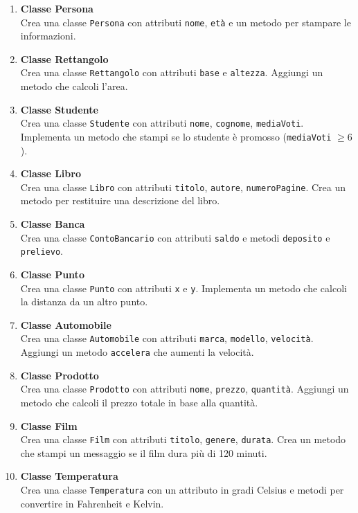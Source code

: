 \documentclass{article}
\begin{document}
\begin{enumerate}
    \item \textbf{Classe Persona} \\
    Crea una classe \texttt{Persona} con attributi \texttt{nome}, \texttt{età} e un metodo per stampare le informazioni.

    \item \textbf{Classe Rettangolo} \\
    Crea una classe \texttt{Rettangolo} con attributi \texttt{base} e \texttt{altezza}. Aggiungi un metodo che calcoli l'area.

    \item \textbf{Classe Studente} \\
    Crea una classe \texttt{Studente} con attributi \texttt{nome}, \texttt{cognome}, \texttt{mediaVoti}. Implementa un metodo che stampi se lo studente è promosso (\texttt{mediaVoti} $\geq 6$).

    \item \textbf{Classe Libro} \\
    Crea una classe \texttt{Libro} con attributi \texttt{titolo}, \texttt{autore}, \texttt{numeroPagine}. Crea un metodo per restituire una descrizione del libro.

    \item \textbf{Classe Banca} \\
    Crea una classe \texttt{ContoBancario} con attributi \texttt{saldo} e metodi \texttt{deposito} e \texttt{prelievo}.

    \item \textbf{Classe Punto} \\
    Crea una classe \texttt{Punto} con attributi \texttt{x} e \texttt{y}. Implementa un metodo che calcoli la distanza da un altro punto.

    \item \textbf{Classe Automobile} \\
    Crea una classe \texttt{Automobile} con attributi \texttt{marca}, \texttt{modello}, \texttt{velocità}. Aggiungi un metodo \texttt{accelera} che aumenti la velocità.

    \item \textbf{Classe Prodotto} \\
    Crea una classe \texttt{Prodotto} con attributi \texttt{nome}, \texttt{prezzo}, \texttt{quantità}. Aggiungi un metodo che calcoli il prezzo totale in base alla quantità.

    \item \textbf{Classe Film} \\
    Crea una classe \texttt{Film} con attributi \texttt{titolo}, \texttt{genere}, \texttt{durata}. Crea un metodo che stampi un messaggio se il film dura più di 120 minuti.

    \item \textbf{Classe Temperatura} \\
    Crea una classe \texttt{Temperatura} con un attributo in gradi Celsius e metodi per convertire in Fahrenheit e Kelvin.
\end{enumerate}
\end{document}

